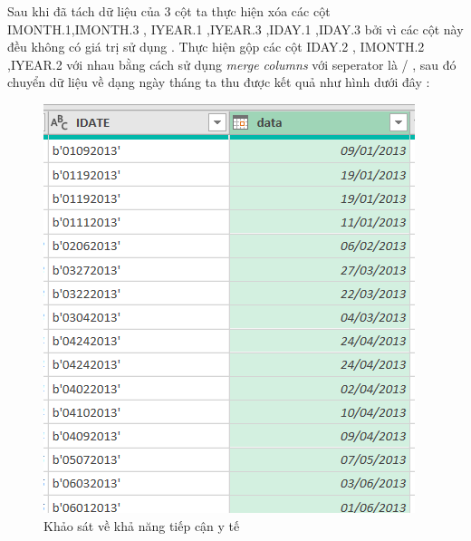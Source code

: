 \begin{itemize}
\begin{figure}[!h]
\begin{center}
\end{center}
   \end{figure}
   Sau khi đã tách dữ liệu của 3 cột ta thực hiện xóa các cột IMONTH.1,IMONTH.3 , IYEAR.1 ,IYEAR.3 ,IDAY.1 ,IDAY.3 bởi vì các cột này đều không có giá trị sử dụng . Thực hiện gộp các cột IDAY.2 , IMONTH.2 ,IYEAR.2    với nhau bằng cách sử dụng\textit{ merge columns} với seperator là / , sau đó chuyển dữ liệu về dạng ngày tháng ta thu được kết quả như hình dưới đây :
    \begin{figure}[!h]
                \begin{center}
                \includegraphics[scale = 0.8]{HONG/3.png}
              \caption{Khảo sát về khả năng tiếp cận y tế}
         

\end{center}
\end{figure}
\end{itemize}
